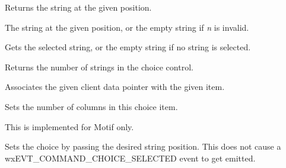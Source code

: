 
Returns the string at the given position.




The string at the given position, or the empty string if {\it n} is invalid.

\label{wxchoicegetstringselection}


Gets the selected string, or the empty string if no string is selected.

\label{wxchoicenumber}


Returns the number of strings in the choice control.

\label{wxchoicesetclientdata}


Associates the given client data pointer with the given item.




\label{wxchoicesetcolumns}


Sets the number of columns in this choice item.




This is implemented for Motif only.

\label{wxchoicesetselection}


Sets the choice by passing the desired string position. This does not cause
a wxEVT\_COMMAND\_CHOICE\_SELECTED event to get emitted.


